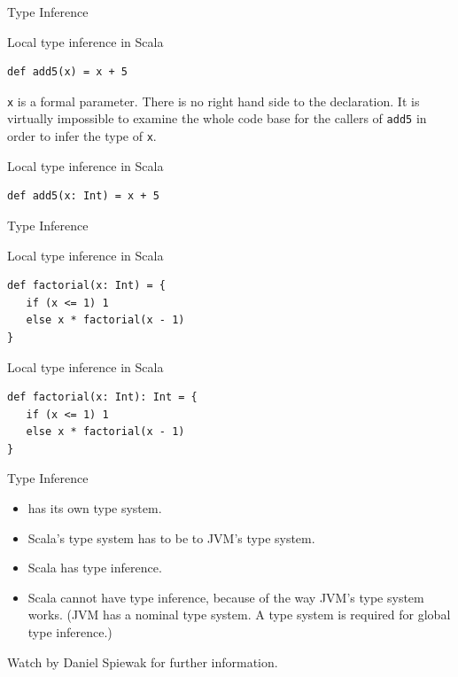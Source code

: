 \begin{frame}[fragile]{Type Inference}
\begin{alertblock}{Local type inference in Scala}
\begin{lstlisting}
def add5(x) = x + 5
\end{lstlisting}
\end{alertblock}
\pause
\lstinline!x! is a formal parameter. There is no right hand side to the
declaration. It is virtually impossible to examine the whole code base for the
callers of \lstinline!add5! in order to infer the type of \lstinline!x!.
\pause
\begin{exampleblock}{Local type inference in Scala}
\begin{lstlisting}
def add5(x: Int) = x + 5
\end{lstlisting}
\end{exampleblock}
\end{frame}

\begin{frame}[fragile]{Type Inference}
\begin{alertblock}{Local type inference in Scala}
\begin{lstlisting}
def factorial(x: Int) = {
   if (x <= 1) 1
   else x * factorial(x - 1)
}
\end{lstlisting}
\end{alertblock}
\pause
\begin{exampleblock}{Local type inference in Scala}
\begin{lstlisting}
def factorial(x: Int): Int = {
   if (x <= 1) 1
   else x * factorial(x - 1)
}
\end{lstlisting}
\end{exampleblock}
\end{frame}

\begin{frame}{Type Inference}
\begin{itemize}
\item {} has its own type system.
\item Scala's type system has to be  to JVM's type system.
\item Scala has  type inference.
\item Scala \alert{cannot have}  type inference, because of
the way JVM's type system works. (JVM has a \alert{nominal} type system. A
 type system is required for global type inference.)
\end{itemize}
\begin{center}
Watch  by Daniel Spiewak
 for further information.
\end{center}
\end{frame}

